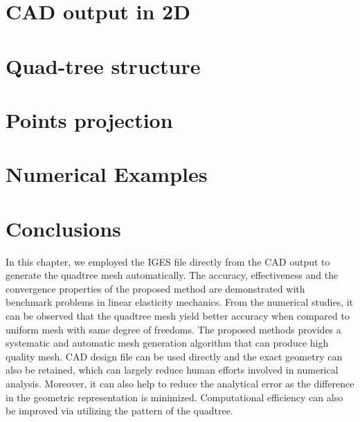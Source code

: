 \section{CAD output in 2D}
\label{qt_sc:iges}


\section{Quad-tree structure}
\label{qt_sc:quadtree}


\section{Points projection}
\label{qt_sc:projection}



\section{Numerical Examples}



% 



\section{Conclusions}
In this chapter, we employed the IGES file directly from the CAD output to generate the quadtree mesh automatically.
The accuracy, effectiveness and the convergence properties of the proposed method are demonstrated with benchmark problems in linear elasticity mechanics.
From the numerical studies, it can be observed that the quadtree mesh yield better accuracy when compared to uniform mesh with same degree of freedoms.
The proposed methods provides a systematic and automatic mesh generation algorithm that can produce high quality mesh.
CAD design file can be used directly and the exact geometry can also be retained, which can largely reduce human efforts involved in numerical analysis.
Moreover, it can also help to reduce the analytical error as the difference in the geometric representation is minimized.
Computational efficiency can also be improved via utilizing the pattern of the quadtree.
\pagebreak
